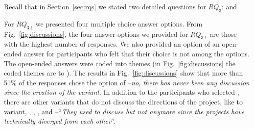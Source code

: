 \nd \textbf{\rqThree}
Recall that in Section~\ref{sec:rqs} we stated two detailed questions for $RQ_{3}$: \textit{\rqThreeOne} and \textit{\rqThreeTwo}

\nd For $RQ_{3.1}$ we presented four multiple choice answer options. From Fig.~\ref{fig:discussions}, the four answer options we provided for $RQ_{3.1}$ are those with the highest number of responses. We also provided an option of an open-ended answer for participants who felt that their choice is not among the options. The open-ended answers were coded into themes (in Fig.~\ref{fig:discussions} the coded themes are \ra to ). 
The results in Fig.~\ref{fig:discussions} show that more than 51\% of the responses chose the option of --\textit{no, there has never been any discussion since the creation of the variant}. In addition to the participants who selected , there are other variants that do not discuss the directions of the project, like  to variant,  ,  , , and --``\emph{They used to discuss but not anymore since the projects have technically diverged from each other}''. 

